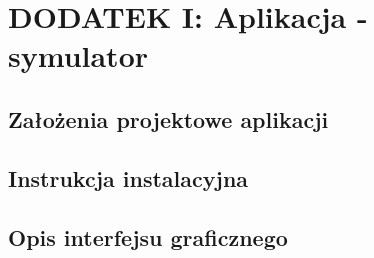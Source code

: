 \chapter*{DODATEK I: Aplikacja - symulator}
\section*{Założenia projektowe aplikacji}
\section*{Instrukcja instalacyjna}
\section*{Opis interfejsu graficznego}